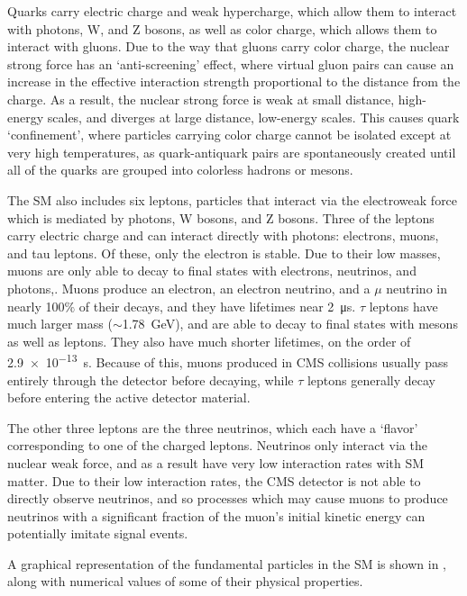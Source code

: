 Quarks carry electric charge and weak hypercharge, which allow them to interact with photons, W, and Z bosons, as well as color charge, which allows them to interact with gluons. 
Due to the way that gluons carry color charge, the nuclear strong force has an `anti-screening' effect, where virtual gluon pairs can cause an increase in the effective interaction strength proportional to the distance from the charge. 
As a result, the nuclear strong force is weak at small distance, high-energy scales, and diverges at large distance, low-energy scales. 
This causes quark `confinement', where particles carrying color charge cannot be isolated except at very high temperatures, as quark-antiquark pairs are spontaneously created until all of the quarks are grouped into colorless hadrons or mesons.

The SM also includes six leptons, particles that interact via the electroweak force which is mediated by photons, W bosons, and Z bosons.
Three of the leptons carry electric charge and can interact directly with photons: electrons, muons, and tau leptons.
Of these, only the electron is stable.
Due to their low masses, muons are only able to decay to final states with electrons, neutrinos, and photons,.
Muons produce an electron, an electron neutrino, and a $\mu$ neutrino in nearly 100$\%$ of their decays, and they have lifetimes near \SI{2}{\micro\second}.
$\tau$ leptons have much larger mass ($\sim$\SI{1.78}{\giga\eV}), and are able to decay to final states with mesons as well as leptons.
They also have much shorter lifetimes, on the order of \SI{2.9e-13}{\second}.
Because of this, muons produced in CMS collisions usually pass entirely through the detector before decaying, while $\tau$ leptons generally decay before entering the active detector material.

The other three leptons are the three neutrinos, which each have a `flavor' corresponding to one of the charged leptons.
Neutrinos only interact via the nuclear weak force, and as a result have very low interaction rates with SM matter.
Due to their low interaction rates, the CMS detector is not able to directly observe neutrinos, and so processes which may cause muons to produce neutrinos with a significant fraction of the muon's initial kinetic energy can potentially imitate signal events.

A graphical representation of the fundamental particles in the SM is shown in , along with numerical values of some of their physical properties.

